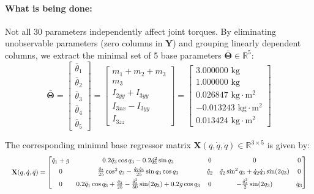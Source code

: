 \documentclass[11pt, a4paper]{article}
\begin{document}
\paragraph{What is being done:}
Not all 30 parameters independently affect joint torques. By eliminating unobservable parameters (zero columns in $\mathbf{Y}$) and grouping linearly dependent columns, we extract the minimal set of 5 base parameters $\bar{\boldsymbol{\Theta}} \in \mathbb{R}^5$:
\begin{equation}
    \bar{\boldsymbol{\Theta}} = \begin{bmatrix}
    \bar{\theta}_1 \\[0.2em]
    \bar{\theta}_2 \\[0.2em]
    \bar{\theta}_3 \\[0.2em]
    \bar{\theta}_4 \\[0.2em]
    \bar{\theta}_5
    \end{bmatrix} = \begin{bmatrix}
    m_1 + m_2 + m_3 \\[0.2em]
    m_3 \\[0.2em]
    I_{2yy} + I_{3yy} \\[0.2em]
    I_{3xx} - I_{3yy} \\[0.2em]
    I_{3zz}
    \end{bmatrix} = \begin{bmatrix}
    3.000000 \text{ kg} \\[0.2em]
    1.000000 \text{ kg} \\[0.2em]
    0.026847 \text{ kg}\cdot\text{m}^2 \\[0.2em]
    -0.013243 \text{ kg}\cdot\text{m}^2 \\[0.2em]
    0.013424 \text{ kg}\cdot\text{m}^2
    \end{bmatrix}
\end{equation}

The corresponding minimal base regressor matrix $\mathbf{X}(q, \dot{q}, \ddot{q}) \in \mathbb{R}^{3 \times 5}$ is given by:
\begin{equation}
\resizebox{\linewidth}{!}{$
\mathbf{X}(q, \dot{q}, \ddot{q}) = \begin{bmatrix}
\ddot{q}_1 + g & 0.2\ddot{q}_3\cos q_3 - 0.2\dot{q}_3^2\sin q_3 & 0 & 0 & 0 \\[0.4em]
0 & \frac{\ddot{q}_2}{25}\cos^2 q_3 - \frac{\dot{q}_2\dot{q}_3}{25}\sin q_3 \cos q_3 & \ddot{q}_2 & \ddot{q}_2\sin^2 q_3 + \dot{q}_2\dot{q}_3\sin(2q_3) & 0 \\[0.4em]
0 & 0.2\ddot{q}_1\cos q_3 + \frac{\ddot{q}_3}{25} - \frac{\dot{q}_2^2}{50}\sin(2q_3) + 0.2g\cos q_3 & 0 & -\frac{\dot{q}_2^2}{2} \sin(2q_3) & \ddot{q}_3
\end{bmatrix}
$}
\end{equation}
\end{document}
